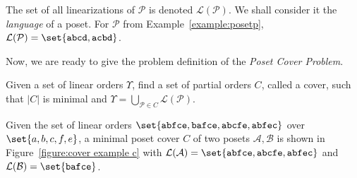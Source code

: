 \documentclass[12pt]{llncs}
\DeclarePairedDelimiter\set\{\}
\newcommand{\poset}[1]{\mathcal{#1}}
\newcommand{\lang}[1]{\mathcal{L}(#1)}
\newcommand{\lin}[1]{\texttt{#1}}
\begin{document}
The set of all linearizations of $\poset{P}$ is denoted $\lang{\poset{P}}$. We shall consider it the \emph{language} of a poset. For $\poset{P}$ from Example~\ref{example:posetp}, $\lang{\poset{P}} = \set{\lin{abcd},\lin{acbd}}$.

Now, we are ready to give the problem definition of the \emph{Poset Cover Problem}.

\begin{definition}
    Given a set of linear orders $\Upsilon$, find a set of partial orders $C$, called a cover, such that $|C|$ is minimal and $\Upsilon = \bigcup_{\poset{P} \in C} \lang{\poset{P}}$.
    \label{definition:pcp}
\end{definition}

\begin{example}
    Given the set of linear orders $\set{\lin{abfce},\lin{bafce},\lin{abcfe},\lin{abfec}}$ over $\set{a,b,c,f,e}$, a minimal poset cover $C$ of two posets $\poset{A},\poset{B}$ is shown in Figure~\ref{figure:cover example c} with ${\lang{\poset{A}} = \set{\lin{abfce},\lin{abcfe},\lin{abfec}}}$ and ${\lang{\poset{B}} = \set{\lin{bafce}}}$.
    \label{example:cover example}
\end{example}
\end{document}
